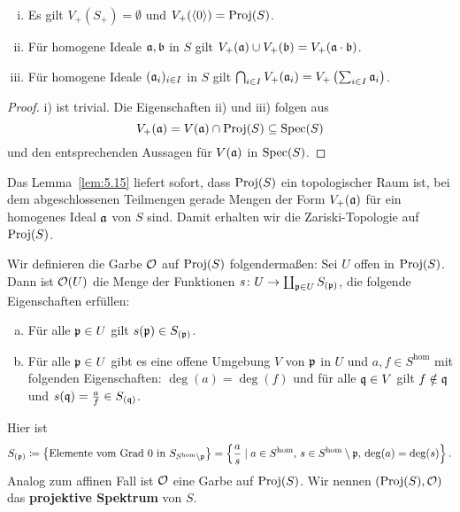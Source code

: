 \begin{lem}
\label{lem:5.15}
	\begin{enumerate}[i)]
		\item Es gilt $V_+(S_+) = \emptyset$ und $V_+(\langle 0 \rangle) = \operatorname{Proj}(S)$.
		\item Für homogene Ideale $\mathfrak{a},\mathfrak{b}$ in $S$ gilt $V_+(\mathfrak{a}) \cup V_+(\mathfrak{b}) = V_+(\mathfrak{a} \cdot \mathfrak{b})$.
		\item Für homogene Ideale $(\mathfrak{a}_i)_{i\in I}$ in $S$ gilt $\bigcap_{i\in I}V_+(\mathfrak{a}_i) = V_+\left(\sum_{i\in I}\mathfrak{a}_i\right)$.
	\end{enumerate}
	\begin{proof}
		i) ist trivial. Die Eigenschaften ii) und iii) folgen aus
		\[
			V_+(\mathfrak{a}) = V(\mathfrak{a}) \cap \operatorname{Proj}(S) \subseteq \operatorname{Spec}(S)
		\]
		und den entsprechenden Aussagen für $V(\mathfrak{a})$ in $\operatorname{Spec}(S)$.
	\end{proof}
\end{lem}

\begin{kons}
\label{kons:5.16}
	Das Lemma~\ref{lem:5.15} liefert sofort, dass $\operatorname{Proj}(S)$ ein topologischer Raum ist, bei dem abgeschlossenen Teilmengen gerade Mengen der Form $V_+(\mathfrak{a})$ für ein homogenes Ideal $\mathfrak{a}$ von $S$ sind. Damit erhalten wir die Zariski-Topologie auf $\operatorname{Proj}(S)$.

	Wir definieren die Garbe $\mathcal{O}$ auf $\operatorname{Proj}(S)$ folgendermaßen: Sei $U$ offen in $\operatorname{Proj}(S)$. Dann ist $\mathcal{O}(U)$ die Menge der Funktionen $s\colon U \to \coprod_{\mathfrak{p} \in U}S_{(\mathfrak{p})}$, die folgende Eigenschaften erfüllen:
	\begin{enumerate}[a)]
		\item Für alle $\mathfrak{p} \in U$ gilt $s(\mathfrak{p}) \in S_{(\mathfrak{p})}$.
		\item Für alle $\mathfrak{p} \in U$ gibt es eine offene Umgebung $V$ von $\mathfrak{p}$ in $U$ und $a,f\in S^{\text{hom}}$ mit folgenden Eigenschaften:
                    $\deg(a)=\deg(f)$ und für alle $\mathfrak{q} \in V$ gilt $f \notin \mathfrak{q}$ und $s(\mathfrak{q}) =  \frac{a}{f} \in S_{(\mathfrak{q})}$.
	\end{enumerate}
	Hier ist
	\[
		S_{(\mathfrak{p})} \coloneqq \left\lbrace\text{Elemente vom Grad }0 \text{ in } S_{S^{\text{hom}}\setminus\mathfrak{p}} \right\rbrace = \left\lbrace \frac{a}{s} \mid a \in S^{\text{hom}},\, s \in S^{\text{hom}}\setminus \mathfrak{p},\, \deg(a) = \deg(s)\right\rbrace.
	\]
	Analog zum affinen Fall ist $\mathcal{O}$ eine Garbe auf $\operatorname{Proj}(S)$. Wir nennen $(\operatorname{Proj}(S),\mathcal{O})$ das \textbf{projektive Spektrum} von $S$.
\end{kons}

